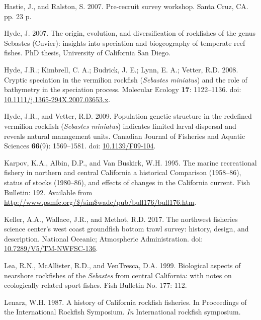 \documentclass[
  english,
  a4paper,
]{article}
\newlength{\cslhangindent}
\newlength{\cslentryspacingunit} %
\newenvironment{CSLReferences}[2] %
 {%
  \setlength{\parindent}{0pt}
  \ifodd #1
  \let\oldpar\par
  \def\par{\hangindent=\cslhangindent\oldpar}
  \fi
  \setlength{\parskip}{#2\cslentryspacingunit}
 }%
 {}
\begin{document}
\begin{CSLReferences}{1}{0}
\leavevmode{}%
Hastie, J., and Ralston, S. 2007. {Pre-recruit survey workshop}. Santa Cruz, CA. pp. 23 p.

\leavevmode{}%
Hyde, J. 2007. {The origin, evolution, and diversification of rockfishes of the genus Sebastes (Cuvier): insights into speciation and biogeography of temperate reef fishes}. PhD thesis, University of California San Diego.

\leavevmode{}%
Hyde, J.R.; Kimbrell, C. A.; Budrick, J. E.; Lynn, E. A.; Vetter, R.D. 2008. {Cryptic speciation in the vermilion rockfish (\emph{Sebastes miniatus}) and the role of bathymetry in the speciation process}. Molecular Ecology \textbf{17}: 1122--1136. doi: \href{https://doi.org/10.1111/j.1365-294X.2007.03653.x}{10.1111/j.1365-294X.2007.03653.x}.

\leavevmode{}%
Hyde, J.R., and Vetter, R.D. 2009. {Population genetic structure in the redefined vermilion rockfish (\emph{Sebastes miniatus}) indicates limited larval dispersal and reveals natural management units}. Canadian Journal of Fisheries and Aquatic Sciences \textbf{66}(9): 1569--1581. doi: \href{https://doi.org/10.1139/F09-104}{10.1139/F09-104}.

\leavevmode{}%
Karpov, K.A., Albin, D.P., and Van Buskirk, W.H. 1995. {The marine recreational fishery in northern and central California a historical Comparison (1958--86), status of stocks (1980--86), and effects of changes in the California current}. Fish Bulletin: 192. Available from \url{http://www.psmfc.org/$/sim$wade/pub/bull176/bull176.htm}.

\leavevmode{}%
Keller, A.A., Wallace, J.R., and Methot, R.D. 2017. {The northwest fisheries science center's west coast groundfish bottom trawl survey: history, design, and description}. National Oceanic; Atmospheric Administration. doi: \href{https://doi.org/10.7289/V5/TM-NWFSC-136}{10.7289/V5/TM-NWFSC-136}.

\leavevmode{}%
Lea, R.N., McAllister, R.D., and VenTresca, D.A. 1999. {Biological aspects of nearshore rockfishes of the \emph{Sebastes} from central California: with notes on ecologically related sport fishes.} Fish Bulletin No. 177: 112.

\leavevmode{}%
Lenarz, W.H. 1987. {A history of California rockfish fisheries. In Proceedings of the International Rockfish Symposium.} \emph{In} International rockfish symposium.


\end{CSLReferences}
\end{document}
